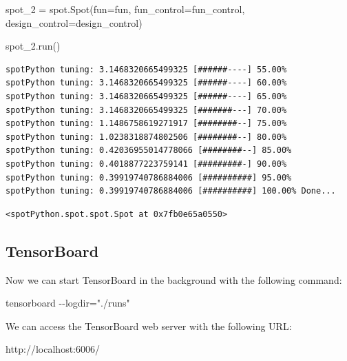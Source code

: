 \documentclass[
  letterpaper,
  DIV=11,
  numbers=noendperiod]{scrreprt}
\newenvironment{Shaded}{\begin{snugshade}}{\end{snugshade}}
\newcommand{\NormalTok}[1]{\textcolor[rgb]{0.00,0.23,0.31}{#1}}
\newcommand{\OperatorTok}[1]{\textcolor[rgb]{0.37,0.37,0.37}{#1}}
\begin{document}
\begin{Shaded}
\begin{Highlighting}[]
\NormalTok{spot\_2 }\OperatorTok{=}\NormalTok{ spot.Spot(fun}\OperatorTok{=}\NormalTok{fun,}
\NormalTok{                   fun\_control}\OperatorTok{=}\NormalTok{fun\_control,}
\NormalTok{                   design\_control}\OperatorTok{=}\NormalTok{design\_control)}
\end{Highlighting}
\end{Shaded}

\begin{Shaded}
\begin{Highlighting}[]
\NormalTok{spot\_2.run()}
\end{Highlighting}
\end{Shaded}

\begin{verbatim}
spotPython tuning: 3.1468320665499325 [######----] 55.00% 
spotPython tuning: 3.1468320665499325 [######----] 60.00% 
spotPython tuning: 3.1468320665499325 [######----] 65.00% 
spotPython tuning: 3.1468320665499325 [#######---] 70.00% 
spotPython tuning: 1.1486758619271917 [########--] 75.00% 
spotPython tuning: 1.0238318874802506 [########--] 80.00% 
spotPython tuning: 0.42036955014778066 [########--] 85.00% 
spotPython tuning: 0.4018877223759141 [#########-] 90.00% 
spotPython tuning: 0.39919740786884006 [##########] 95.00% 
spotPython tuning: 0.39919740786884006 [##########] 100.00% Done...
\end{verbatim}

\begin{verbatim}
<spotPython.spot.spot.Spot at 0x7fb0e65a0550>
\end{verbatim}

\subsection{TensorBoard}\label{tensorboard-8}

Now we can start TensorBoard in the background with the following
command:

\begin{Shaded}
\begin{Highlighting}[]
\NormalTok{tensorboard {-}{-}logdir="./runs"}
\end{Highlighting}
\end{Shaded}

We can access the TensorBoard web server with the following URL:

\begin{Shaded}
\begin{Highlighting}[]
\NormalTok{http://localhost:6006/}
\end{Highlighting}
\end{Shaded}
\end{document}
